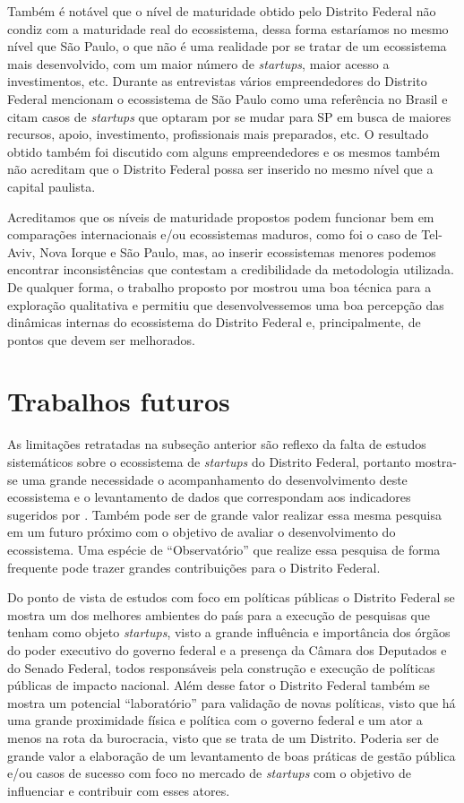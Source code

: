 Também é notável que o nível de maturidade obtido pelo Distrito Federal não condiz com a maturidade real do ecossistema, dessa forma estaríamos no mesmo nível que São Paulo, o que não é uma realidade por se tratar de um ecossistema mais desenvolvido, com um maior número de \textit{startups}, maior acesso a investimentos, etc. Durante as entrevistas vários empreendedores do Distrito Federal mencionam o ecossistema de São Paulo como uma referência no Brasil e citam casos de \textit{startups} que optaram por se mudar para SP em busca de maiores recursos, apoio, investimento, profissionais mais preparados, etc. O resultado obtido também foi discutido com alguns empreendedores e os mesmos também não acreditam que o Distrito Federal possa ser inserido no mesmo nível que a capital paulista.

Acreditamos que os níveis de maturidade propostos podem funcionar bem em comparações internacionais e/ou ecossistemas maduros, como foi o caso de Tel-Aviv, Nova Iorque e São Paulo, mas, ao inserir ecossistemas menores podemos encontrar inconsistências que contestam a credibilidade da metodologia utilizada. De qualquer forma, o trabalho proposto por  mostrou uma boa técnica para a exploração qualitativa e permitiu que desenvolvessemos uma boa percepção das dinâmicas internas do ecossistema do Distrito Federal e, principalmente, de pontos que devem ser melhorados.

\section{Trabalhos futuros}
\label{subsection:trabalhos_futuros}

As limitações retratadas na subseção anterior são reflexo da falta de estudos sistemáticos sobre o ecossistema de \textit{startups} do Distrito Federal, portanto mostra-se uma grande necessidade o acompanhamento do desenvolvimento deste ecossistema e o levantamento de dados que correspondam aos indicadores sugeridos por . Também pode ser de grande valor realizar essa mesma pesquisa em um futuro próximo com o objetivo de avaliar o desenvolvimento do ecossistema. Uma espécie de ``Observatório'' que realize essa pesquisa de forma frequente pode trazer grandes contribuições para o Distrito Federal.

Do ponto de vista de estudos com foco em políticas públicas o Distrito Federal se mostra um dos melhores ambientes do país para a execução de pesquisas que tenham como objeto \textit{startups}, visto a grande influência e importância dos órgãos do poder executivo do governo federal e a presença da Câmara dos Deputados e do Senado Federal, todos responsáveis pela construção e execução de políticas públicas de impacto nacional. Além desse fator o Distrito Federal também se mostra um potencial ``laboratório'' para validação de novas políticas, visto que há uma grande proximidade física e política com o governo federal e um ator a menos na rota da burocracia, visto que se trata de um Distrito. Poderia ser de grande valor a elaboração de um levantamento de boas práticas de gestão pública e/ou casos de sucesso com foco no mercado de \textit{startups} com o objetivo de influenciar e contribuir com esses atores. 

